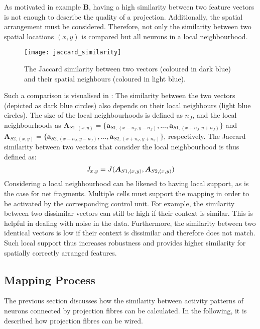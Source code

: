 As motivated in  example $\boldsymbol{B}$, having a high similarity between two feature vectors is not enough to describe the quality of a projection.
Additionally, the spatial arrangement must be considered.
Therefore, not only the similarity between two spatial locations $(x,y)$ is compared but all neurons in a local neighbourhood.
\begin{figure}[h]
    \centering
    \texttt{[image: jaccard\_similarity]}
    \caption[Similarity between two vectors and their spatial neighbours]{The Jaccard similarity between two vectors (coloured in dark blue) and their spatial neighbours (coloured in light blue).}
\end{figure}
Such a comparison is visualised in :
The similarity between the two vectors (depicted as dark blue circles) also depends on their local neighbours (light blue circles).
The size of the local neighbourhoods is defined as $n_J$, and the local neighbourhoods as $\boldsymbol{A}_{S1,(x,y)} = \{ \boldsymbol{a}_{S1,(x-n_J,y-n_J)}, ..., \boldsymbol{a}_{S1,(x+n_J,y+n_J)}\}$ and $\boldsymbol{A}_{S2,(x,y)} = \{ \boldsymbol{a}_{S2,(x-n_J,y-n_J)}, ..., \boldsymbol{a}_{S2,(x+n_J,y+n_J)}\}$, respectively.
The Jaccard similarity between two vectors that consider the local neighbourhood is thus defined as:
%
\begin{align}\eqlbl{jaccard2}
	J_{x,y} = J(\boldsymbol{A}_{S1,(x,y)}, \boldsymbol{A}_{S2,(x,y)})
\end{align}
%
Considering a local neighbourhood can be likened to having local support, as is the case for net fragments. Multiple cells must support the mapping in order to be activated by the corresponding control unit. For example, the similarity between two dissimilar vectors can still be high if their context is similar. This is helpful in dealing with noise in the data.
Furthermore, the similarity between two identical vectors is low if their context is dissimilar and therefore does not match.
Such local support thus increases robustness and provides higher similarity for spatially correctly arranged features.


\subsection{Mapping Process}
The previous section discusses how the similarity between activity patterns of neurons connected by projection fibres can be calculated.
In the following, it is described how projection fibres can be wired.

